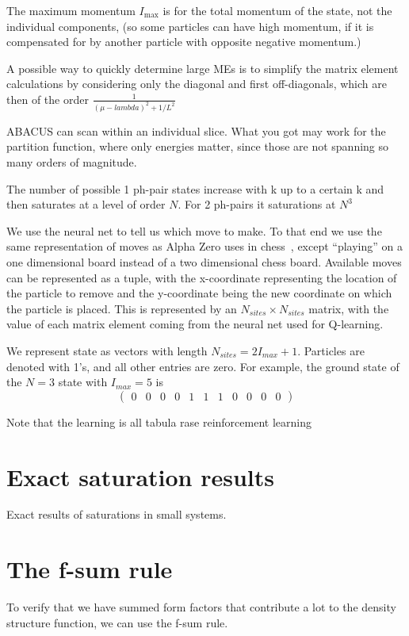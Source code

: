 \documentclass[11pt, a4paper]{report} %
\begin{document}
The maximum momentum $I_{\max}$ is for the total momentum of the state, not the individual components, (so some particles can have high momentum, if it is compensated for by another particle with opposite negative momentum.)

A possible way to quickly determine large MEs is to simplify the matrix element calculations by considering only the diagonal and first off-diagonals, which are then of the order $\frac{1}{(\mu-lambda)^2 + 1/L^2}$

ABACUS can scan within an individual slice.
What you got may work for the partition function, where only energies matter, since those are not spanning so many orders of magnitude.

The number of possible 1 ph-pair states increase with k up to a certain k and then saturates at a level of order $N$.
For 2 ph-pairs it saturations at $N^3$

We use the neural net to tell us which move to make.
To that end we use the same representation of moves as Alpha Zero uses in chess~\cite{Silver2017}, except ``playing'' on a one dimensional board instead of a two dimensional chess board.
Available moves can be represented as a tuple, with the x-coordinate representing the location of the particle to remove and the y-coordinate being the new coordinate on which the particle is placed.
This is represented by an $N_{sites} \times N_{sites}$ matrix, with the value of each matrix element coming from the neural net used for Q-learning.

We represent state as vectors with length $N_{sites} = 2 I_{max} + 1$.
Particles are denoted with 1's, and all other entries are zero.
For example, the ground state of the $N=3$ state with $I_{max} = 5$ is 
\begin{equation}
  \begin{pmatrix} 0 & 0 & 0 & 0 & 1 & 1 & 1 & 0 & 0 & 0 & 0 \end{pmatrix}
\end{equation}

Note that the learning is all tabula rase reinforcement learning

\section{Exact saturation results}

Exact results of saturations in small systems.

\section{The f-sum rule}
To verify that we have summed form factors that contribute a lot to the density structure function, we can use the f-sum rule.
\end{document}
